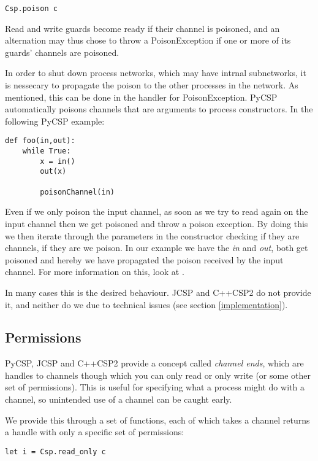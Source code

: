 \documentclass[a4paper,12pt]{article}
\begin{document}
\begin{verbatim}
Csp.poison c 
\end{verbatim}

Read and write guards become ready if their channel is poisoned, and an
alternation may thus chose to throw a PoisonException if one or more of its
guards' channels are poisoned.

In order to shut down process networks, which may have intrnal subnetworks, it
is nessecary to propagate the poison to the other processes in the network. As
mentioned, this can be done in the handler for PoisonException. PyCSP
automatically poisons channels that are arguments to process constructors. In 
the following PyCSP example:
\begin{verbatim}
def foo(in,out):
    while True:
        x = in()
        out(x)
        
        poisonChannel(in)
\end{verbatim}
Even if we only poison the input channel, as soon as we try to read again on
the input channel then we get poisoned and throw a poison exception. By doing
this we then iterate through the parameters in the constructor checking if
they are channels, if they are we poison. In our example we have the {\it in}
and {\it out}, both get poisoned and hereby we have propagated the poison
received by the input channel. For more information on this, look at
\cite{pycsp}.

In many cases this is the desired behaviour. JCSP and C++CSP2 do not provide it,
and neither do we due to technical issues (see section \ref{implementation}).

\subsection{Permissions}

PyCSP, JCSP and C++CSP2 provide a concept called \emph{channel ends}, which are
handles to channels though which you can only read or only write (or some other
set of permissions). This is useful for specifying what a process might do with
a channel, so unintended use of a channel can be caught early.

We provide this through a set of functions, each of which takes a channel
returns a handle with only a specific set of permissions:

\begin{verbatim}
let i = Csp.read_only c
\end{verbatim}
\end{document}
